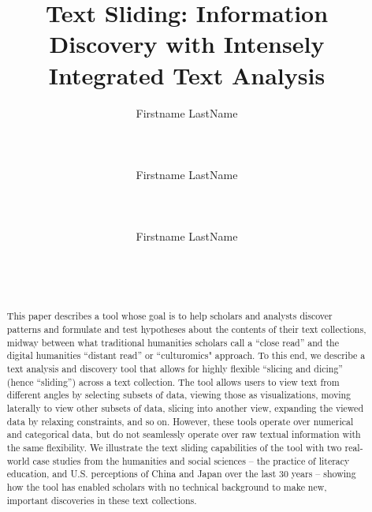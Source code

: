 \documentclass{sig-alternate}
\begin{document}
\title{Text Sliding: Information Discovery with Intensely Integrated Text Analysis}

\author{%
\alignauthor Firstname LastName\\
       \\
       \\
       \\
\alignauthor Firstname LastName\\
       \\
       \\
       \\
\alignauthor Firstname LastName\\
       \\
       \\
       \\
}

\maketitle

\begin{abstract}

This paper describes a tool whose goal is to help scholars and analysts discover patterns and formulate and test hypotheses about the contents of their text collections, midway between what traditional humanities scholars call a  ``close read'' and the digital humanities  ``distant read'' or  ``culturomics" approach.  
To this end, we describe a text analysis and discovery tool that allows for highly flexible  ``slicing and dicing'' (hence  ``sliding'') across a text collection.  The tool allows users to view text from different angles by selecting subsets of data, viewing those as visualizations, moving laterally to view other subsets of data, slicing into another view, expanding the viewed data by relaxing constraints, and so on.  However, these tools operate over numerical and categorical data, but do not seamlessly operate over raw textual information with the same flexibility. We illustrate the text sliding capabilities of the tool with two real-world case studies from the humanities and social sciences -- the practice of literacy education, and U.S. perceptions of China and Japan over the last 30 years -- showing how the tool has enabled scholars with no technical background to make new, important discoveries in these text collections.

\end{abstract}
\end{document}
